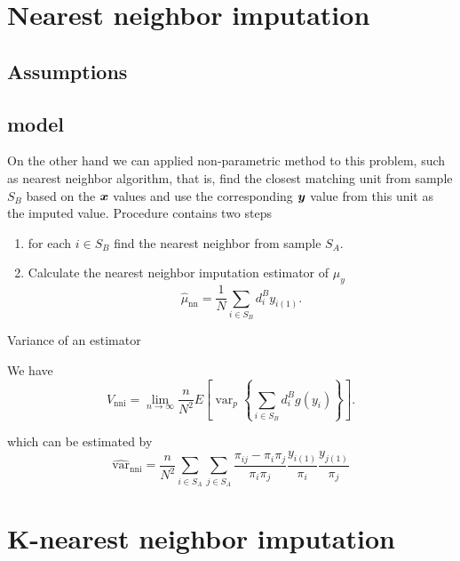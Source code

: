 \documentclass[
  letterpaper,
  DIV=11,
  numbers=noendperiod]{scrreprt}
\begin{document}
\hypertarget{nearest-neighbor-imputation}{%
\section{Nearest neighbor
imputation}\label{nearest-neighbor-imputation}}

\hypertarget{assumptions}{%
\subsection{Assumptions}\label{assumptions}}

\hypertarget{model}{%
\subsection{model}\label{model}}

On the other hand we can applied non-parametric method to this problem,
such as nearest neighbor algorithm, that is, find the closest matching
unit from sample \(S_B\) based on the \(\boldsymbol{x}\) values and use the
corresponding \(\boldsymbol{y}\) value from this unit as the imputed value.
Procedure contains two steps

\begin{enumerate}
\def\labelenumi{\arabic{enumi}.}
\item
  for each \(i \in S_B\) find the nearest neighbor from sample \(S_A\).
\item
  Calculate the nearest neighbor imputation estimator of \(\mu_y\) \[
  \begin{equation}
  \hat{\mu}_\mathrm{nn}=\frac{1}{N} \sum_{i \in S_B} d_i^B y_{i(1)} .
  \end{equation}
  \]
\end{enumerate}

Variance of an estimator

We have \[
V_{\mathrm{nni}}=\lim _{n \rightarrow \infty} \frac{n}{N^2} E\left[\operatorname{var}_p\left\{\sum_{i \in S_B} d_i^B g\left(y_i\right)\right\}\right] .
\]

which can be estimated by \[
\hat{\text{var}}_{\mathrm{nni}}=\frac{n}{N^2} \sum_{i \in S_A} \sum_{j \in S_A} \frac{\pi_{i j}-\pi_i \pi_j}{\pi_i \pi_j} \frac{y_{i(1)}}{\pi_i} \frac{y_{j(1)}}{\pi_j}
\]

\hypertarget{k-nearest-neighbor-imputation}{%
\section{K-nearest neighbor
imputation}\label{k-nearest-neighbor-imputation}}
\end{document}
